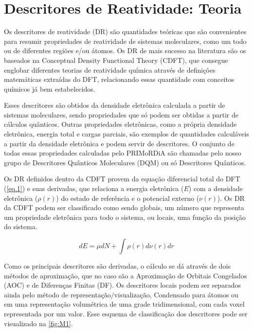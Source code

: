 \documentclass[a4paper,11pt]{refart}
\begin{document}
\newpage
\section{Descritores de Reatividade: Teoria}

Os descritores de reatividade (DR) são quantidades teóricas que são convenientes para resumir propriedades de reatividade de sistemas moleculares, como um todo ou de diferentes regiões e/ou átomos. Os DR de mais sucesso na literatura são os baseados na Conceptual Density Functional Theory (CDFT), que consegue englobar diferentes teorias de reatividade química através de definições matemáticas extraídas do DFT, relacionando essas quantidade com conceitos químicos já bem estabelecidos\cite{geerlings2003conceptual}. 

Esses descritores são obtidos da densidade eletrônica calculada a partir de sistemas moleculares, sendo propriedades que só podem ser obtidas a partir de cálculos quânticos. Outras propriedades eletrônicas, como a própria densidade eletrônica, energia total e cargas parciais, são exemplos de quantidades calculáveis a partir da densidade eletrônica e podem servir de descritores. O conjunto de todas essas propriedades calculadas pelo PRIMoRDiA são chamadas pelo nosso grupo de Descritores Quânticos Moleculares (DQM) ou só Descritores Quânticos.

Os DR definidos dentro da CDFT provem da equação diferencial total do DFT (\autoref{eq.1}) e suas derivadas\cite{parr1978elect}, que relaciona a energia eletrônica ($E$) com a densidade eletrônica ($\rho(r)$) do estado de referência e o potencial externo ($\nu(r)$). Os DR da CDFT podem ser classificado como sendo globais, um número que representa um propriedade eletrônica para todo o sistema, ou locais, uma função da posição do sistema. 

\begin{equation}
dE = \mu dN + \int \rho(r) d \nu (r) dr
\label{eq.1}
\end{equation}

Como os principais descritores são derivadas, o cálculo se dá através de dois métodos de aproximação, que no caso são a Aproximação de Orbitais Congelados (AOC) e de Diferenças Finitas (DF). Os descritores locais podem ser separados ainda pelo método de representação/visualização, Condensado para átomos ou em uma representação volumétrica de uma grade tridimensional, com cada voxel representada por um valor. Esse esquema de classificação dos descritores pode ser visualizado na \autoref{fig:M1}.
\end{document}
